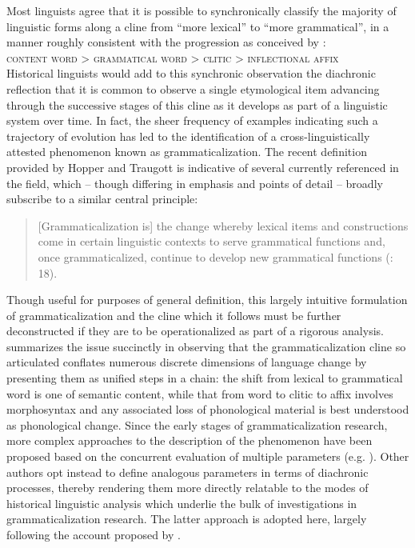 \documentclass[output=paper]{langsci/langscibook}
\begin{document}
Most linguists agree that it is possible to synchronically classify the majority of linguistic forms along a cline from “more lexical” to “more grammatical”, in a manner roughly consistent with the progression as conceived by \citet{HopperTraugott2003}:\\

\textsc{content} \textsc{word} > \textsc{grammatical} \textsc{word} > \textsc{clitic} > \textsc{inflectional} \textsc{affix}\\

Historical linguists would add to this synchronic observation the diachronic reflection that it is common to observe a single etymological item advancing through the successive stages of this cline as it develops as part of a linguistic system over time. In fact, the sheer frequency of examples indicating such a trajectory of evolution has led to the identification of a cross-linguistically attested phenomenon known as grammaticalization. The recent definition provided by Hopper and Traugott is indicative of several currently referenced in the field, which – though differing in emphasis and points of detail – broadly subscribe to a similar central principle:

\begin{quote}
[Grammaticalization is] the change whereby lexical items and constructions come in certain linguistic contexts to serve grammatical functions and, once grammaticalized, continue to develop new grammatical functions (\citealt{HopperTraugott2003}: 18).
\end{quote}

Though useful for purposes of general definition, this largely intuitive formulation of grammaticalization and the cline which it follows must be further deconstructed if they are to be operationalized as part of a rigorous analysis. \citet{Andersen2008} summarizes the issue succinctly in observing that the grammaticalization cline so articulated conflates numerous discrete dimensions of language change by presenting them as unified steps in a chain: the shift from lexical to grammatical word is one of semantic content, while that from word to clitic to affix involves morphosyntax and any associated loss of phonological material is best understood as phonological change. Since the early stages of grammaticalization research, more complex approaches to the description of the phenomenon have been proposed based on the concurrent evaluation of multiple parameters (e.g. \citealt{Lehmann1985}). Other authors opt instead to define analogous parameters in terms of diachronic processes, thereby rendering them more directly relatable to the modes of historical linguistic analysis which underlie the bulk of investigations in grammaticalization research. The latter approach is adopted here, largely following the account proposed by \citet{Heine2007}. 
\end{document}
